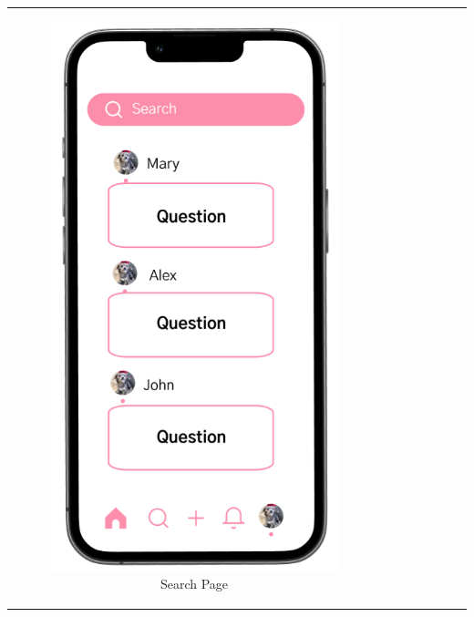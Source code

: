 \begin{longtable}{@{}cc@{}}
    \begin{subfigure}{.5\textwidth}
        \centering
        \includegraphics[width=.8\linewidth]{Figures/search.png}
        \caption{\footnotesize Search Page}
        \label{fig:search}
    \end{subfigure}%
    &
    \begin{subfigure}{.5\textwidth}
        \centering

\end{subfigure}
\end{longtable}
